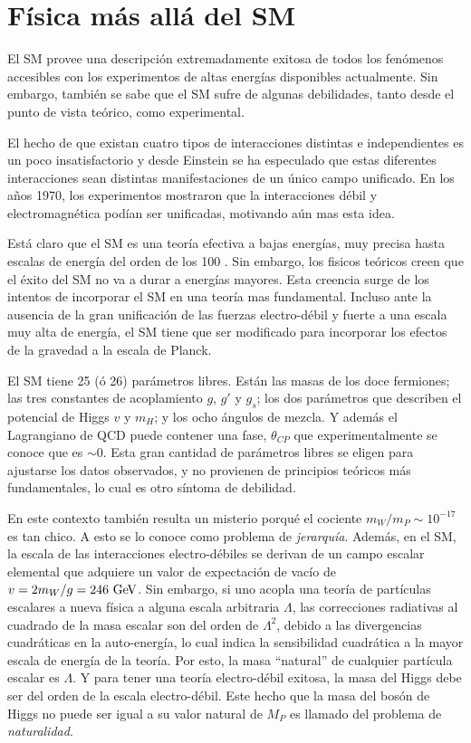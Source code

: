 \section{Física más allá del SM}

El SM provee una descripción extremadamente exitosa de todos los fenómenos
accesibles con los experimentos de altas energías disponibles actualmente.
Sin embargo,
también se sabe que el SM sufre de algunas debilidades, tanto desde el punto de
vista teórico, como experimental.

El hecho de que existan cuatro tipos de interacciones distintas e independientes
es un poco insatisfactorio y desde Einstein se ha especulado que estas
diferentes interacciones sean distintas manifestaciones de un único campo
unificado. En los a\~nos 1970, los experimentos mostraron que la interacciones
débil y electromagnética podían ser unificadas, motivando aún mas esta idea.

Está claro que el SM es una teoría efectiva a bajas energías, muy precisa  hasta
escalas de energía del orden de los 100 {\gev}. Sin embargo, los fisicos teóricos creen
que el éxito del SM no va a durar a energías mayores. Esta creencia surge de los
intentos de incorporar el SM en una teoría mas fundamental. Incluso ante la
ausencia de la gran unificación de las fuerzas electro-débil y fuerte a una
escala muy alta de energía, el SM tiene que ser modificado para incorporar los
efectos de la gravedad a la escala de Planck.

El SM tiene 25 (ó 26) parámetros libres. Están las masas de los doce fermiones;
las tres constantes de acoplamiento $g$, $g'$ y $g_s$; los dos parámetros que
describen el potencial de Higgs $v$ y $m_H$; y los ocho ángulos de mezcla. Y
además el Lagrangiano de QCD puede contener una fase, $\theta_{CP}$ que
experimentalmente se conoce que es $\sim 0$. Esta gran cantidad de parámetros
libres se eligen para ajustarse los datos observados, y no provienen de
principios teóricos más fundamentales, lo cual es otro síntoma de debilidad.

En este contexto también resulta un misterio porqué el cociente $m_W/m_P \sim
10^{-17}$ es tan chico. A esto se lo conoce como problema de \emph{jerarquía}.
Además, en el SM, la escala de las interacciones electro-débiles se derivan de un
campo escalar elemental que adquiere un valor de expectación de vacío de $v = 2
m_W /g = 246 \gev$. Sin embargo, si uno acopla una teoría de partículas
escalares a nueva física a alguna escala arbitraria $\Lambda$, las correcciones
radiativas al cuadrado de la masa escalar son del orden de $\Lambda^2$, debido a
las divergencias cuadráticas en la auto-energía, lo cual indica la sensibilidad
cuadrática a la mayor escala de energía de la teoría. Por esto, la masa
``natural'' de cualquier partícula escalar es $\Lambda$. Y para tener una teoría
electro-débil exitosa, la masa del Higgs debe ser del orden de la escala
electro-débil. Este hecho que la masa del bosón de Higgs no puede ser igual a su
valor natural de $M_P$ es llamado del problema de \emph{naturalidad}.

